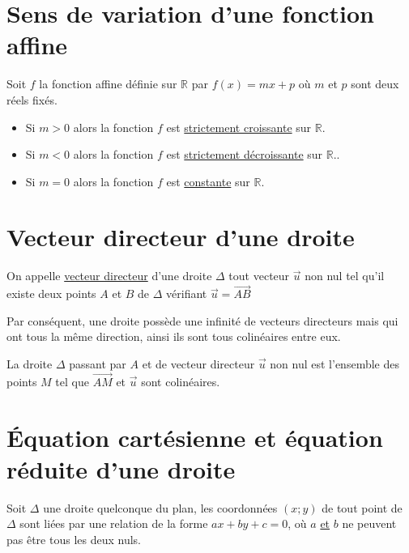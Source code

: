 \documentclass[french]{book}
\begin{document}
\section{Sens de variation d'une fonction affine}

\begin{prop}
Soit $f$ la fonction affine définie sur $\mathbb{R}$ par $f(x)=mx+p$ où $m$ et $p$ sont deux réels fixés.

\begin{itemize}
\item Si \underline{$m>0$} alors la fonction $f$ est \underline{strictement croissante} sur $\mathbb{R}$.
\item Si \underline{$m<0$} alors la fonction $f$ est \underline{strictement décroissante} sur $\mathbb{R}.$.
\item Si \underline{$m=0$} alors la fonction $f$ est \underline{constante} sur $\mathbb{R}$.
\end{itemize}
\end{prop}



\section{Vecteur directeur d'une droite}

\begin{defn}
On appelle \underline{vecteur directeur} d'une droite $\Delta$ tout vecteur $\overrightarrow{u}$ non nul tel qu'il existe deux points $A$ et $B$ de $\Delta$ vérifiant $\overrightarrow{u}=\overrightarrow{AB}$  
\end{defn}

Par conséquent, une droite possède une infinité de vecteurs directeurs mais qui ont tous la même direction, ainsi ils sont tous colinéaires entre eux.

\begin{prop}
La droite $\Delta$ passant par $A$ et de vecteur directeur $\overrightarrow{u}$ non nul est l'ensemble des points $M$ tel que $\overrightarrow{AM}$ et  $\overrightarrow{u}$ sont colinéaires.
\end{prop}

\section{Équation cartésienne et équation réduite d'une droite}

\begin{prop}
Soit $\Delta$ une droite quelconque du plan, les coordonnées $(x;y)$ de tout point de $\Delta$ sont liées par une relation de la forme $ax+by+c=0$, où $a$ \underline{et} $b$ ne peuvent pas être tous les deux nuls. 
\end{prop}
\end{document}
